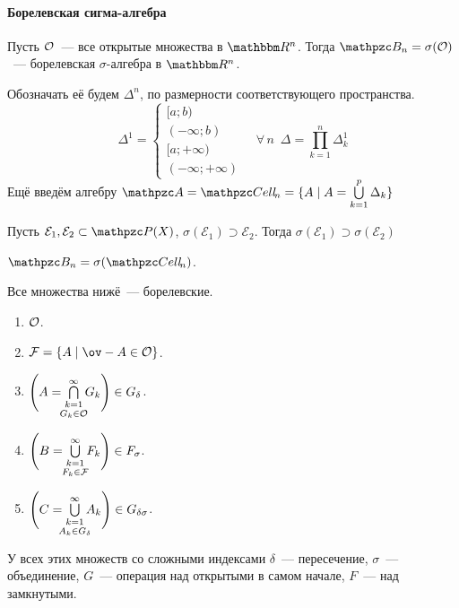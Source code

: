 \documentclass[12pt, timbord]{longnotes}
\begin{document}
\paragraph{Борелевская сигма-алгебра}
\begin{defn}\label{defn:meas::setsys::borel}
  Пусть $\mathcal O$~--- все открытые множества в $\R^n$. Тогда $\mathpzc B_n = \sigma(\open)
  $~--- борелевская $\sigma$-алгебра в $\R^n$.
\end{defn}

\begin{defn}[Ячейка в $\R^n$ ]\label{defn:meas::setsys::cell}
  Обозначать её будем $\Delta^n$, по размерности соответствующего пространства.
  \[
    \Delta^1 = \begin{cases}
      [a;b) \\
      (-\infty;b) \\
      [a;+\infty) \\
      (-\infty;+\infty)
    \end{cases} \quad
    \forall\, n \;\: \Delta = \prod_{k=1}^n \Delta^1 _k 
  \]
  Ещё введём алгебру $\alg = \Cell_n = \{ A \mid A = \bigcup_{k=1}^p \Delta_k\}$
\end{defn} 

\begin{lem}\label{lem:meas::setsys::algsubset}
  Пусть $\mathcal E_1, \mathcal E_2 \subset \pset(X)$, $\sigma(\mathcal E_1) \supset \mathcal E_2$.
  Тогда $\sigma(\mathcal E_1) \supset \sigma(\mathcal E_2)$
\end{lem}
\begin{thrm}\label{thrm:meas::setsys::borelcell}
  $\borel_n = \sigma(\Cell_n)$.
\end{thrm}

\begin{exmp}\label{exmp:meas::setsys::borel}
  Все множества нижё~--- борелевские.
  \begin{enumerate}
    \item $\mathcal O $.
    \item $\closed =\{A \mid \ov-{A} \in \open \}$.
    \item $\Biggl(A 
      = \bigcap_{\substack{{k=1}\\[0.12em]\mathclap{ G_k \in \open}}}^\infty G_k \Biggr)\in G_\delta$.
    \item $\Biggl(B 
      = \bigcup_{\substack{{k=1}\\[0.12em]\mathclap{ F_k \in \closed}}}^\infty F_k \Biggr)\in
      F_\sigma$.
    \item $\Biggl(C 
      = \bigcup_{\substack{{k=1}\\[0.12em]\mathclap{ A_k \in G_{\delta}}}}^\infty A_k \Biggr)
      \in G_{\delta\sigma}$.
  \end{enumerate}
  У всех этих множеств со сложными индексами $\delta$~--- пересечение, $\sigma$~--- объединение,
  $G$~--- операция над открытыми в самом начале, $F$~--- над замкнутыми.
\end{exmp}
\end{document}

